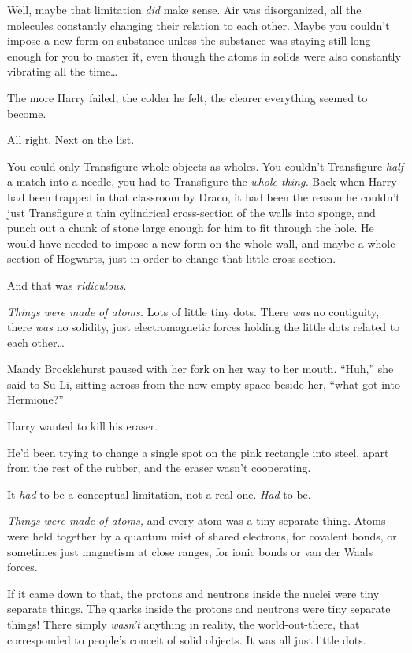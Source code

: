 Well, maybe that limitation \emph{did} make sense. Air was disorganized, all the molecules constantly changing their relation to each other. Maybe you couldn’t impose a new form on substance unless the substance was staying still long enough for you to master it, even though the atoms in solids were also constantly vibrating all the time…

The more Harry failed, the colder he felt, the clearer everything seemed to become.

All right. Next on the list.

You could only Transfigure whole objects as wholes. You couldn’t Transfigure \emph{half} a match into a needle, you had to Transfigure the \emph{whole thing.} Back when Harry had been trapped in that classroom by Draco, it had been the reason he couldn’t just Transfigure a thin cylindrical cross-section of the walls into sponge, and punch out a chunk of stone large enough for him to fit through the hole. He would have needed to impose a new form on the whole wall, and maybe a whole section of Hogwarts, just in order to change that little cross-section.

And that was \emph{ridiculous}.

\emph{Things were made of atoms.} Lots of little tiny dots. There \emph{was} no contiguity, there \emph{was} no solidity, just electromagnetic forces holding the little dots related to each other…

\later

Mandy Brocklehurst paused with her fork on her way to her mouth. “Huh,” she said to Su Li, sitting across from the now-empty space beside her, “what got into Hermione?”

\later

Harry wanted to kill his eraser.

He’d been trying to change a single spot on the pink rectangle into steel, apart from the rest of the rubber, and the eraser wasn’t cooperating.

It \emph{had} to be a conceptual limitation, not a real one. \emph{Had} to be.

\emph{Things were made of atoms,} and every atom was a tiny separate thing. Atoms were held together by a quantum mist of shared electrons, for covalent bonds, or sometimes just magnetism at close ranges, for ionic bonds or van der Waals forces.

If it came down to that, the protons and neutrons inside the nuclei were tiny separate things. The quarks inside the protons and neutrons were tiny separate things! There simply \emph{wasn’t} anything in reality, the world-out-there, that corresponded to people’s conceit of solid objects. It was all just little dots.

